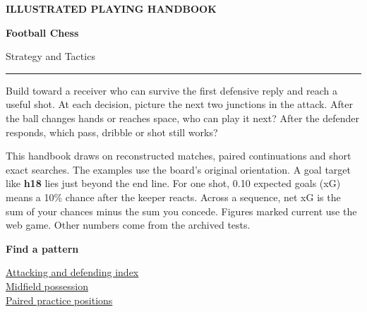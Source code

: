 \documentclass[11pt,letterpaper]{article}
\newcommand{\eyebrow}[1]{{\sffamily\bfseries\footnotesize\color{teal}\MakeUppercase{#1}}}
\newcommand{\leadbox}[2]{\par\vspace{2mm}\begingroup\setlength{\fboxsep}{10pt}%
  \noindent\colorbox{panel}{\parbox{\dimexpr\linewidth-2\fboxsep\relax}{%
  {\sffamily\small\bfseries\color{teal}#1}\par\vspace{.6mm}\small #2}}\endgroup\par\vspace{1mm}}
\begin{document}
\thispagestyle{empty}
\vspace*{8mm}
{\eyebrow{Illustrated playing handbook}\par}
\vspace{4mm}
{\fontsize{53}{54}\selectfont\bfseries Football Chess\par}
\vspace{1.5mm}
{\fontsize{30}{32}\selectfont Strategy and Tactics\par}
\vspace{4mm}
{\color{teal}\rule{\linewidth}{1.2pt}\par}
\vspace{5mm}
\noindent\begin{minipage}[t]{.441\linewidth}
\vspace{0pt}\RaggedRight
Build toward a receiver who can survive the first defensive reply and reach a useful shot. At each decision, picture the next two junctions in the attack. After the ball changes hands or reaches space, who can play it next? After the defender responds, which pass, dribble or shot still works?


\vspace{3mm}
This handbook draws on reconstructed matches, paired continuations and short exact searches. The examples use the board\textquoteright{}s original orientation. A goal target like \textbf{h18} lies just beyond the end line. For one shot, 0.10 expected goals (xG) means a 10\% chance after the keeper reacts. Across a sequence, net xG is the sum of your chances minus the sum you concede. Figures marked current use the web game. Other numbers come from the archived tests.


\vspace{3mm}
\leadbox{Find a pattern}{\hyperlink{ch00}{Attacking and defending index}\\[1mm]
  \hyperlink{ch07}{Midfield possession}\\[1mm]\hyperlink{ch08}{Paired practice positions}}
\end{minipage}\hfill
\end{document}
